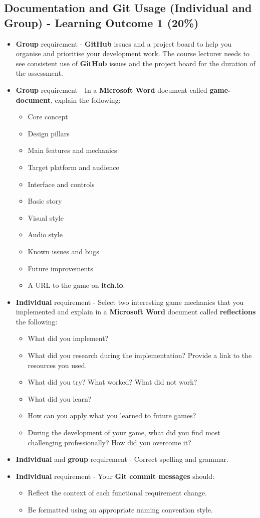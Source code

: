 \documentclass{article}
\begin{document}
\subsection*{Documentation and Git Usage (Individual and Group) - Learning Outcome 1 (20\%)}
\begin{itemize}
	\item \textbf{Group} requirement - \textbf{GitHub} issues and a project board to help you organise and prioritise your development work. The course lecturer needs to see consistent use of \textbf{GitHub} issues and the project board for the duration of the assessment.
	\item \textbf{Group} requirement - In a \textbf{Microsoft Word} document called \textbf{game-document}, explain the following:
	\begin{itemize}
		\item Core concept
		\item Design pillars
		\item Main features and mechanics
		\item Target platform and audience
		\item Interface and controls
		\item Basic story
		\item Visual style
		\item Audio style
		\item Known issues and bugs
		\item Future improvements
		\item A URL to the game on \textbf{itch.io}.
	\end{itemize}
	\item \textbf{Individual} requirement - Select two interesting game mechanics that you implemented and explain in a \textbf{Microsoft Word} document called \textbf{reflections} the following:
		\begin{itemize}
			\item What did you implement?
			\item What did you research during the implementation? Provide a link to the resources you used.
			\item What did you try? What worked? What did not work?
			\item What did you learn?
			\item How can you apply what you learned to future games?
			\item During the development of your game, what did you find most challenging professionally? How did you overcome it?
		\end{itemize}
    \item \textbf{Individual} and \textbf{group} requirement - Correct spelling and grammar.
    \item \textbf{Individual} requirement - Your \textbf{Git commit messages} should:
    \begin{itemize}
      \item Reflect the context of each functional requirement change.
      \item Be formatted using an appropriate naming convention style.
    \end{itemize}
\end{itemize} 
\end{document}
